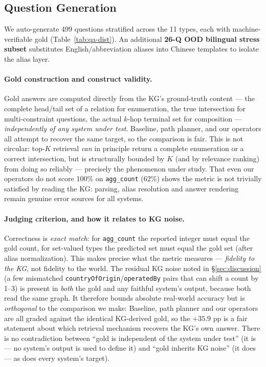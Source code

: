 \documentclass[review]{elsarticle}
\newcommand{\qtype}[1]{\texttt{\small #1}}
\begin{document}
\subsection{Question Generation}
We auto-generate 499 questions stratified across the 11 types, each with machine-verifiable gold (Table~\ref{tab:qa-dist}). An additional \textbf{26-Q OOD bilingual stress subset} substitutes English/abbreviation aliases into Chinese templates to isolate the alias layer.

\paragraph{Gold construction and construct validity.}
Gold answers are computed directly from the KG's ground-truth content --- the complete head/tail set of a relation for enumeration, the true intersection for multi-constraint questions, the actual $k$-hop terminal set for composition --- \emph{independently of any system under test}. Baseline, path planner, and our operators all attempt to recover the same target, so the comparison is fair. This is not circular: top-$K$ retrieval \emph{can} in principle return a complete enumeration or a correct intersection, but is structurally bounded by $K$ (and by relevance ranking) from doing so reliably --- precisely the phenomenon under study. That even our operators do not score 100\% on \qtype{agg\_count} (62\%) shows the metric is not trivially satisfied by reading the KG: parsing, alias resolution and answer rendering remain genuine error sources for all systems.

\paragraph{Judging criterion, and how it relates to KG noise.}
Correctness is \emph{exact match}: for \qtype{agg\_count} the reported integer must equal the gold count, for set-valued types the predicted set must equal the gold set (after alias normalization). This makes precise what the metric measures --- \emph{fidelity to the KG}, not fidelity to the world. The residual KG noise noted in §\ref{sec:discussion} (a few mismatched \texttt{countryOfOrigin}/\texttt{operatedBy} pairs that can shift a count by 1--3) is present in \emph{both} the gold and any faithful system's output, because both read the same graph. It therefore bounds absolute real-world accuracy but is \emph{orthogonal} to the comparison we make: Baseline, path planner and our operators are all graded against the identical KG-derived gold, so the $+35.9$ pp is a fair statement about which retrieval mechanism recovers the KG's own answer. There is no contradiction between ``gold is independent of the system under test'' (it is --- no system's output is used to define it) and ``gold inherits KG noise'' (it does --- as does every system's target).
\end{document}
